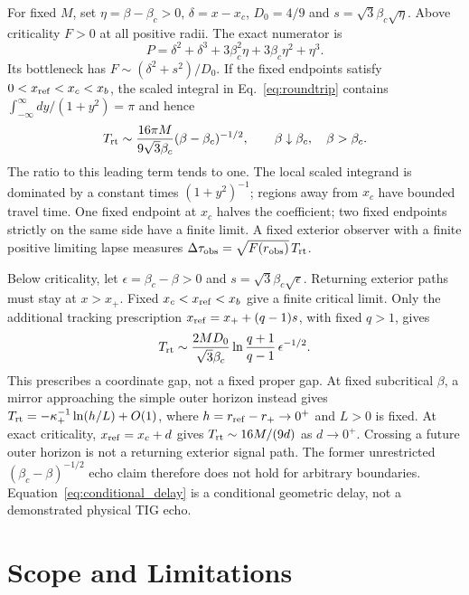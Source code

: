 \documentclass[11pt,a4paper]{article}
\begin{document}
For fixed $M$, set $\eta=\beta-\beta_c>0$, $\delta=x-x_c$,
$D_0=4/9$ and $s=\sqrt3\beta_c\sqrt{\eta}$. Above criticality $F>0$ at
all positive radii. The exact numerator is
\begin{equation}
P=\delta^2+\delta^3+3\beta_c^2\eta+3\beta_c\eta^2+\eta^3.
\end{equation}
Its bottleneck has $F\sim(\delta^2+s^2)/D_0$. If the fixed endpoints
satisfy $0<x_{\rm ref}<x_c<x_b$, the scaled integral in
Eq.~\eqref{eq:roundtrip} contains
$\int_{-\infty}^{\infty}dy/(1+y^2)=\pi$ and hence
\begin{equation}
T_{\rm rt}\sim\frac{16\pi M}{9\sqrt3\beta_c}
(\beta-\beta_c)^{-1/2},\qquad \beta\downarrow\beta_c,\quad\beta>\beta_c.
\label{eq:conditional_delay}
\end{equation}
The ratio to this leading term tends to one. The local scaled integrand is
dominated by a constant times $(1+y^2)^{-1}$; regions away from $x_c$
have bounded travel time. One fixed endpoint at $x_c$ halves the coefficient;
two fixed endpoints strictly on the same side have a finite limit.
A fixed exterior observer with a finite positive limiting lapse measures
$\Delta\tau_{\rm obs}=\sqrt{F(r_{\rm obs})}\,T_{\rm rt}$.

Below criticality, let $\epsilon=\beta_c-\beta>0$ and
$s=\sqrt3\beta_c\sqrt{\epsilon}$. Returning exterior paths must stay at
$x>x_+$. Fixed $x_c<x_{\rm ref}<x_b$ give a finite critical limit.
Only the additional tracking prescription
$x_{\rm ref}=x_++(q-1)s$, with fixed $q>1$, gives
\begin{equation}
T_{\rm rt}\sim\frac{2MD_0}{\sqrt3\beta_c}
\ln\frac{q+1}{q-1}\,\epsilon^{-1/2}.
\end{equation}
This prescribes a coordinate gap, not a fixed proper gap.
At fixed subcritical $\beta$, a mirror approaching the simple outer horizon
instead gives $T_{\rm rt}=-\kappa_+^{-1}\ln(h/L)+O(1)$, where
$h=r_{\rm ref}-r_+\to0^+$ and $L>0$ is fixed.
At exact criticality, $x_{\rm ref}=x_c+d$ gives
$T_{\rm rt}\sim16M/(9d)$ as $d\to0^+$.
Crossing a future outer horizon is not a returning exterior signal path.
The former unrestricted $(\beta_c-\beta)^{-1/2}$ echo claim therefore does
not hold for arbitrary boundaries. Equation~\eqref{eq:conditional_delay}
is a conditional geometric delay, not a demonstrated physical TIG echo.

\section{Scope and Limitations}
\end{document}
